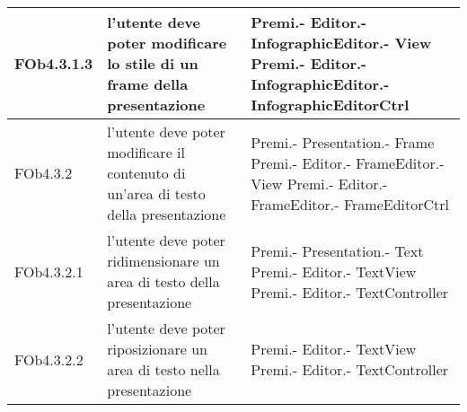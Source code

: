 \begin{longtable}{|l|p{5cm}|p{4cm}|}
\hline
FOb4.3.1.3 & l'utente deve poter modificare lo stile di un frame della presentazione & Premi.- \linebreak Editor.- \linebreak InfographicEditor.- \linebreak View \linebreak Premi.- \linebreak Editor.- \linebreak InfographicEditor.- \linebreak InfographicEditorCtrl \linebreak \\
\hline
FOb4.3.2 & l'utente deve poter modificare il contenuto di un'area di testo della presentazione & Premi.- \linebreak Presentation.- \linebreak Frame \linebreak Premi.- \linebreak Editor.- \linebreak FrameEditor.- \linebreak View \linebreak Premi.- \linebreak Editor.- \linebreak FrameEditor.- \linebreak FrameEditorCtrl \linebreak \\
\hline
FOb4.3.2.1 & l'utente deve poter ridimensionare un area di testo della presentazione & Premi.- \linebreak Presentation.- \linebreak Text \linebreak Premi.- \linebreak Editor.- \linebreak TextView \linebreak Premi.- \linebreak Editor.- \linebreak TextController \linebreak \\
\hline
FOb4.3.2.2 & l'utente deve poter riposizionare un area di testo nella presentazione & Premi.- \linebreak Editor.- \linebreak TextView \linebreak Premi.- \linebreak Editor.- \linebreak TextController \linebreak \\

\end{longtable}
